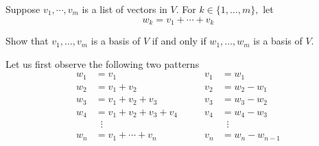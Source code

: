 \begin{xrcs}
  Suppose $v_1, \cdots, v_m$ is a list of vectors in $V$. For $k \in \{1, \ldots, m\},$ let
  \begin{equation}
    w_k = v_1 + \cdots + v_k
  \end{equation}

  Show that $v_1, \ldots, v_m$ is a basis of $V$ if and only if $w_1, \ldots, w_m$ is a basis of $V$.
\end{xrcs}
\begin{prf}
  Let us first observe the following two patterns
  \begin{equation}
    \begin{aligned}
      w_1 &= v_1                    & \qquad v_1 &= w_1       \\
      w_2 &= v_1 + v_2              & \qquad v_2 &= w_2 - w_1 \\
      w_3 &= v_1 + v_2 + v_3        & \qquad v_3 &= w_3 - w_2 \\
      w_4 &= v_1 + v_2 + v_3 + v_4  & \qquad v_4 &= w_4 - w_3 \\
      &\;\;\vdots               &            &\;\;\vdots \\
      w_n &= v_1 + \cdots + v_n     & \qquad v_n &= w_n - w_{n-1}
    \end{aligned}
  \end{equation}
\end{prf}
